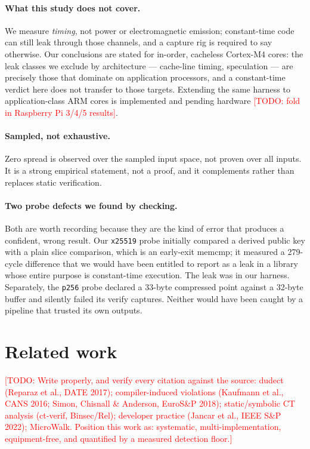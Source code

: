 \documentclass[11pt,a4paper]{article}
\newcommand{\todo}[1]{\textcolor{red}{[TODO: #1]}}
\begin{document}
\paragraph{What this study does not cover.}
We measure \emph{timing}, not power or electromagnetic emission; constant-time
code can still leak through those channels, and a capture rig is required to say
otherwise. Our conclusions are stated for in-order, cacheless Cortex-M4 cores:
the leak classes we exclude by architecture --- cache-line timing, speculation
--- are precisely those that dominate on application processors, and a
constant-time verdict here does not transfer to those targets. Extending the
same harness to application-class ARM cores is implemented and pending hardware
\todo{fold in Raspberry Pi 3/4/5 results}.

\paragraph{Sampled, not exhaustive.}
Zero spread is observed over the sampled input space, not proven over all
inputs. It is a strong empirical statement, not a proof, and it complements
rather than replaces static verification.

\paragraph{Two probe defects we found by checking.}
Both are worth recording because they are the kind of error that produces a
confident, wrong result. Our \texttt{x25519} probe initially compared a derived
public key with a plain slice comparison, which is an early-exit memcmp; it
measured a 279-cycle difference that we would have been entitled to report as a
leak in a library whose entire purpose is constant-time execution. The leak was
in our harness. Separately, the \texttt{p256} probe declared a 33-byte
compressed point against a 32-byte buffer and silently failed its verify
captures. Neither would have been caught by a pipeline that trusted its own
outputs.

\section{Related work}
\todo{Write properly, and verify every citation against the source: dudect
(Reparaz et al., DATE 2017); compiler-induced violations (Kaufmann et al., CANS
2016; Simon, Chisnall \& Anderson, EuroS\&P 2018); static/symbolic CT analysis
(ct-verif, Binsec/Rel); developer practice (Jancar et al., IEEE S\&P 2022);
MicroWalk. Position this work as: systematic, multi-implementation,
equipment-free, and quantified by a measured detection floor.}
\end{document}
